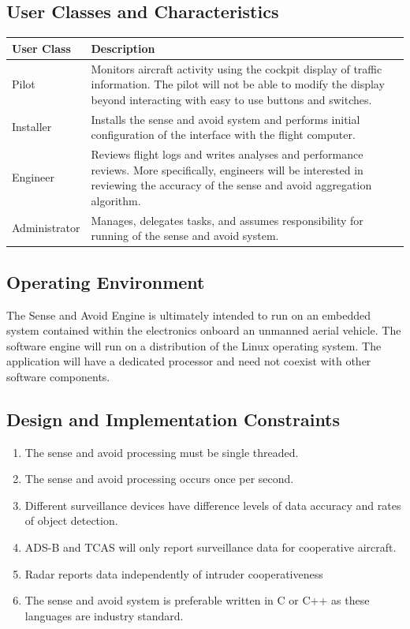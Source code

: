 \documentclass[12pt,oneside,letterpaper]{article}
\begin{document}
\subsection{User Classes and Characteristics}
\begin{longtable}{|l|p{3.8in}|}
\hline
\textbf{User Class}&\textbf{Description}\\
\hline
Pilot & Monitors aircraft activity using the cockpit display of traffic information. The pilot will not be able to modify the display beyond interacting with easy to use buttons and switches.\\
\hline
Installer & Installs the sense and avoid system and performs initial configuration of the interface with the flight computer.\\
\hline
Engineer & Reviews flight logs and writes analyses and performance reviews. More specifically, engineers will be interested in reviewing the accuracy of the sense and avoid aggregation algorithm.\\
\hline
Administrator & Manages, delegates tasks, and assumes responsibility for running of the sense and avoid system.\\
\hline
\end{longtable}

\subsection{Operating Environment}
The Sense and Avoid Engine is ultimately intended to run on an embedded system contained within the electronics onboard an unmanned aerial vehicle. The software engine will run on a distribution of the Linux operating system. The application will have a dedicated processor and need not coexist with other software components.

\subsection{Design and Implementation Constraints}
\begin{enumerate}
\item The sense and avoid processing must be single threaded.
\item The sense and avoid processing occurs once per second.
\item Different surveillance devices have difference levels of data accuracy and rates of object detection.
\item ADS-B and TCAS will only report surveillance data for cooperative aircraft.
\item Radar reports data independently of intruder cooperativeness
\item The sense and avoid system is preferable written in C or C++ as these languages are industry standard.
\end{enumerate}
\end{document}
